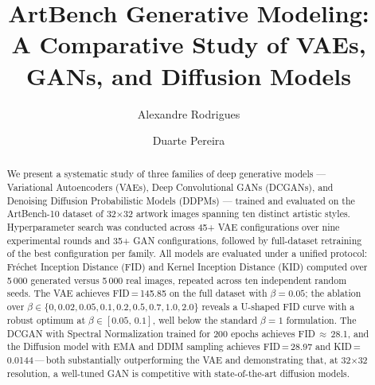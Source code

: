 \documentclass[runningheads]{llncs}
\begin{document}
\title{ArtBench Generative Modeling:\texorpdfstring{\\}{ }A Comparative Study of VAEs, GANs, and Diffusion Models}

\author{Alexandre Rodrigues \and
Duarte Pereira}



\maketitle

\begin{abstract}
We present a systematic study of three families of deep generative models —
Variational Autoencoders (VAEs), Deep Convolutional GANs (DCGANs), and Denoising
Diffusion Probabilistic Models (DDPMs) — trained and evaluated on the ArtBench-10
dataset of 32$\times$32 artwork images spanning ten distinct artistic styles.
Hyperparameter search was conducted across 45+ VAE configurations over nine experimental
rounds and 35+ GAN configurations, followed by full-dataset retraining of the best
configuration per family.
All models are evaluated under a unified protocol: Fréchet Inception Distance (FID)
and Kernel Inception Distance (KID) computed over 5\,000 generated versus 5\,000
real images, repeated across ten independent random seeds.
The VAE achieves FID\,=\,145.85 on the full dataset with $\beta = 0.05$; the ablation
over $\beta \in \{0, 0.02, 0.05, 0.1, 0.2, 0.5, 0.7, 1.0, 2.0\}$ reveals a
U-shaped FID curve with a robust optimum at $\beta \in [0.05,\,0.1]$, well below
the standard $\beta = 1$ formulation. The DCGAN with Spectral Normalization trained
for 200 epochs achieves FID\,$\approx$\,28.1, and the Diffusion model with EMA and
DDIM sampling achieves FID\,=\,28.97 and KID\,=\,0.0144\,---\,both substantially
outperforming the VAE and demonstrating that, at 32$\times$32 resolution, a well-tuned
GAN is competitive with state-of-the-art diffusion models.
\end{abstract}

\end{document}
